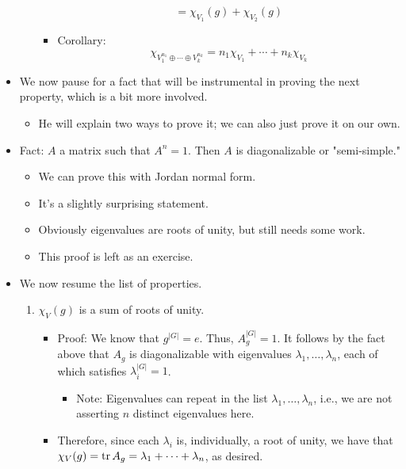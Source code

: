 \documentclass[../notes.tex]{subfiles}
\begin{document}
\begin{itemize}
\begin{enumerate}
\begin{itemize}
\begin{equation*}
                = \chi_{V_1}(g)+\chi_{V_2}(g)
            \end{equation*}
            \item Corollary:
            \begin{equation*}
                \chi_{V_1^{n_1}\oplus\cdots\oplus V_k^{n_k}} = n_1\chi_{V_1}+\cdots+n_k\chi_{V_k}
            \end{equation*}
        \end{itemize}
    \end{enumerate}
    \item We now pause for a fact that will be instrumental in proving the next property, which is a bit more involved.
    \begin{itemize}
        \item He will explain two ways to prove it; we can also just prove it on our own.
    \end{itemize}
    \item Fact: $A$ a matrix such that $A^n=1$. Then $A$ is diagonalizable or "semi-simple."
    \begin{itemize}
        \item We can prove this with Jordan normal form.
        \item It's a slightly surprising statement.
        \item Obviously eigenvalues are roots of unity, but still needs some work.
        \item This proof is left as an exercise.
    \end{itemize}
    \item We now resume the list of properties.
    \begin{enumerate}[resume]
        \item $\chi_V(g)$ is a sum of roots of unity.
        \begin{itemize}
            \item Proof: We know that $g^{|G|}=e$. Thus, $A_g^{|G|}=1$. It follows by the fact above that $A_g$ is diagonalizable with eigenvalues $\lambda_1,\dots,\lambda_n$, each of which satisfies $\lambda_i^{|G|}=1$.
            \begin{itemize}
                \item Note: Eigenvalues can repeat in the list $\lambda_1,\dots,\lambda_n$, i.e., we are not asserting $n$ distinct eigenvalues here.
            \end{itemize}
            \item Therefore, since each $\lambda_i$ is, individually, a root of unity, we have that $\chi_V(g)=\tr A_g=\lambda_1+\cdots+\lambda_n$, as desired.

\end{itemize}
\end{enumerate}
\end{itemize}
\end{document}
